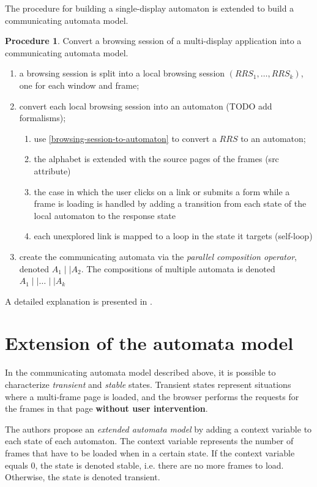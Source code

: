 \documentclass[a4paper,10pt]{article}
\theoremstyle{plain} %
\theoremstyle{definition}
\newtheorem{procedure}{Procedure}
\theoremstyle{remark}
\begin{document}
The procedure for building a single-display automaton is extended to build a communicating automata model.

\begin{procedure}
  Convert a browsing session of a multi-display application into a communicating automata model.

  \begin{enumerate}
    \item a browsing session is split into a local browsing session $(RRS_1,\dots,RRS_k)$, one for each window and frame;
    \item convert each local browsing session into an automaton (TODO add formalisms);
      \begin{enumerate}
        \item use \cref{browsing-session-to-automaton} to convert a $RRS$ to an automaton;
        \item the alphabet is extended with the source pages of the frames (src attribute)
        \item the case in which the user clicks on a link or submits a form while a frame is loading is handled by adding a transition from each state of the local automaton to the response state
        \item each unexplored link is mapped to a loop in the state it targets (self-loop)
      \end{enumerate}
    \item create the communicating automata via the \textit{parallel composition operator}, denoted $A_1\mid\mid A_2$. The compositions of multiple automata is denoted $A_1\mid\mid\dots\mid\mid A_k$
  \end{enumerate}
\end{procedure}

A detailed explanation is presented in \cite{Haydar2004}.

\section{Extension of the automata model}

In the communicating automata model described above, it is possible to characterize \textit{transient} and \textit{stable} states. Transient states represent situations where a multi-frame page is loaded, and the browser performs the requests for the frames in that page \textbf{without user intervention}.

The authors propose an \textit{extended automata model} by adding a context variable to each state of each automaton. The context variable represents the number of frames that have to be loaded when in a certain state. If the context variable equals 0, the state is denoted stable, i.e. there are no more frames to load. Otherwise, the state is denoted transient.
\end{document}
